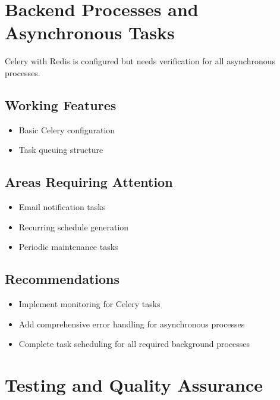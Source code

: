 \section{Backend Processes and Asynchronous Tasks}

\begin{tcolorbox}[
    enhanced,
    title={~70\% Complete},
    attach boxed title to top left,
    boxed title style={
        colback=warning!50,
        colframe=warning!50,
        arc=0mm,
    },
    colback=white,
    colframe=warning!50,
    arc=0mm,
    fonttitle=\bfseries
]
    Celery with Redis is configured but needs verification for all asynchronous processes.
\end{tcolorbox}

\subsection{Working Features}
\begin{itemize}
    \item Basic Celery configuration
    \item Task queuing structure
\end{itemize}

\subsection{Areas Requiring Attention}
\begin{itemize}
    \item Email notification tasks
    \item Recurring schedule generation
    \item Periodic maintenance tasks
\end{itemize}

\subsection{Recommendations}
\begin{itemize}
    \item Implement monitoring for Celery tasks
    \item Add comprehensive error handling for asynchronous processes
    \item Complete task scheduling for all required background processes
\end{itemize}

\section{Testing and Quality Assurance}

